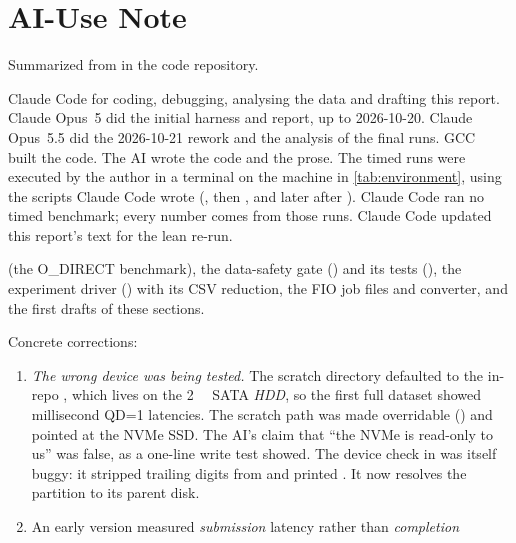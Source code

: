 \section{AI-Use Note}\label{sec:ai-use}

Summarized from  in the code repository.

\begin{description}[style=nextline]
  \item[Tools used] Claude Code for coding, debugging, analysing the data and drafting this report.
        Claude Opus~5 did the initial harness and report, up to 2026-10-20. Claude Opus~5.5 did the
        2026-10-21 rework and the analysis of the final runs. GCC~\sysGCC{} built the code. The AI wrote the code and the prose. The timed runs were
        executed by the author in a terminal on the machine in \cref{tab:environment}, using the scripts
        Claude Code wrote (, then , and later
         after ). Claude Code ran no timed benchmark;
        every number comes from those runs. Claude Code updated this report's text for the lean re-run.
  \item[What they helped generate]  (the O\_DIRECT  benchmark), the
        data-safety gate () and its tests (), the experiment driver
        () with its CSV reduction, the FIO job files and converter, and the first drafts of
        these sections.
  \item[What was independently modified, tested, or rejected] Concrete corrections:
        \begin{enumerate}[nosep]
          \item \emph{The wrong device was being tested.} The scratch directory defaulted to the in-repo
                , which lives on the \qty{2}{\tera\byte} SATA \emph{HDD}, so the
                first full dataset showed millisecond QD=1 latencies. The scratch path was made
                overridable () and pointed at the NVMe SSD. The AI's claim that
                \enquote{the NVMe is read-only to us} was false, as a one-line write test showed. The
                device check in  was itself buggy: it stripped trailing digits from
                 and printed . It now resolves the partition to its
                parent disk.
          \item An early version measured \emph{submission} latency rather than \emph{completion}

\end{enumerate}
\end{description}
